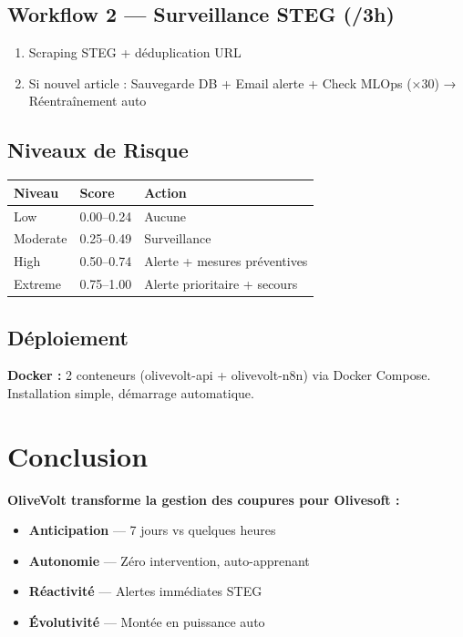 \documentclass[10pt,a4paper]{article}
\begin{document}
\subsection*{Workflow 2 — Surveillance STEG (/3h)}

\begin{enumerate}
\item Scraping STEG + déduplication URL
\item Si nouvel article : Sauvegarde DB + Email alerte + Check MLOps (×30) → Réentraînement auto
\end{enumerate}

\subsection*{Niveaux de Risque}

\begin{center}
\footnotesize
\begin{tabular}{llp{4cm}}
\toprule
\textbf{Niveau} & \textbf{Score} & \textbf{Action} \\
\midrule
Low & 0.00–0.24 & Aucune \\
Moderate & 0.25–0.49 & Surveillance \\
High & 0.50–0.74 & Alerte + mesures préventives \\
Extreme & 0.75–1.00 & Alerte prioritaire + secours \\
\bottomrule
\end{tabular}
\end{center}

\subsection*{Déploiement}

\textbf{Docker :} 2 conteneurs (olivevolt-api + olivevolt-n8n) via Docker Compose. Installation simple, démarrage automatique.

\section*{Conclusion}
\vspace{-2pt}

\begin{tcolorbox}[colback=olivegreen!10,colframe=olivegreen,boxrule=0.6pt]
\small
\textbf{OliveVolt transforme la gestion des coupures pour Olivesoft :}
\begin{itemize}
\item \textbf{Anticipation} — 7 jours vs quelques heures
\item \textbf{Autonomie} — Zéro intervention, auto-apprenant
\item \textbf{Réactivité} — Alertes immédiates STEG
\item \textbf{Évolutivité} — Montée en puissance auto
\end{itemize}
\end{tcolorbox}
\end{document}
